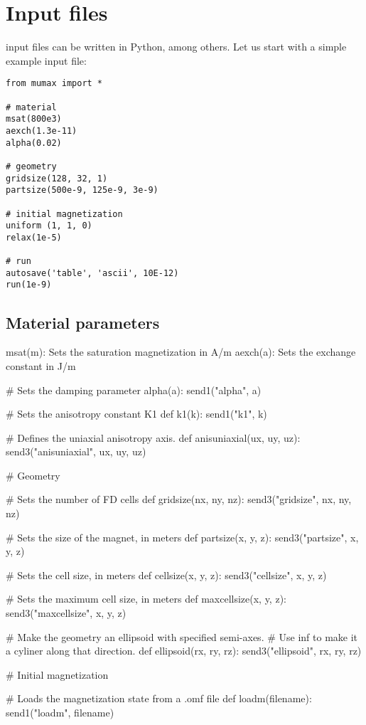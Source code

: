 \section{Input files}


\mumax input files can be written in Python, among others. Let us start with a simple example input file: 

\begin{verbatim}
from mumax import *

# material
msat(800e3)
aexch(1.3e-11)
alpha(0.02)

# geometry 
gridsize(128, 32, 1)
partsize(500e-9, 125e-9, 3e-9)

# initial magnetization
uniform	(1, 1, 0)
relax(1e-5)

# run
autosave('table', 'ascii', 10E-12)
run(1e-9)
\end{verbatim}


\subsection{Material parameters}

msat(m): Sets the saturation magnetization in A/m
aexch(a): Sets the exchange constant in J/m

# Sets the damping parameter alpha(a):
	send1("alpha", a)


# Sets the anisotropy constant K1
def k1(k):
	send1("k1", k)

# Defines the uniaxial anisotropy axis.
def anisuniaxial(ux, uy, uz):
	send3("anisuniaxial", ux, uy, uz)


# Geometry

# Sets the number of FD cells
def gridsize(nx, ny, nz):
	send3("gridsize", nx, ny, nz)

# Sets the size of the magnet, in meters
def partsize(x, y, z):
	send3("partsize", x, y, z)

# Sets the cell size, in meters
def cellsize(x, y, z):
	send3("cellsize", x, y, z)

# Sets the maximum cell size, in meters
def maxcellsize(x, y, z):
	send3("maxcellsize", x, y, z)

# Make the geometry an ellipsoid with specified semi-axes.
# Use inf to make it a cyliner along that direction.
def ellipsoid(rx, ry, rz):
	send3("ellipsoid", rx, ry, rz)

# Initial magnetization

# Loads the magnetization state from a .omf file
def loadm(filename):
	send1("loadm", filename)

